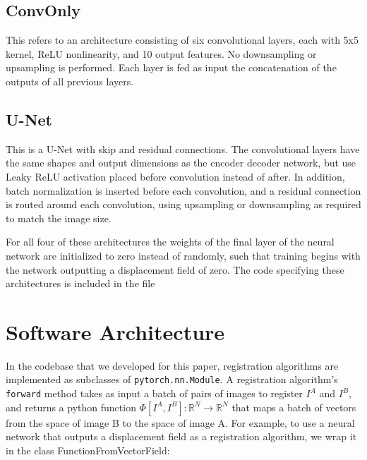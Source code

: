 \subsection{ConvOnly} This refers to an architecture consisting of six convolutional layers, each with 5x5 kernel, ReLU nonlinearity,  and 10 output features. No downsampling or upsampling is performed. Each layer is fed as input the concatenation of the outputs of all previous layers. \\ 
\subsection{U-Net} This is a U-Net with skip and residual connections. The convolutional layers have the same shapes and output dimensions as the encoder decoder network, but use Leaky ReLU activation placed before convolution instead of after. In addition, batch normalization is inserted before each convolution, and a residual connection is routed around each convolution, using upsampling or downsampling as required to match the image size. \par

For all four of these architectures the weights of the final layer of the neural network are initialized to zero instead of randomly, such that training begins with the network outputting a displacement field of zero. The code specifying these architectures is included in the file 


\section{Software Architecture}
 In the codebase that we developed for this paper, registration algorithms are implemented as subclasses of \verb|pytorch.nn.Module|. A registration algorithm's \verb|forward| method takes as input a batch of pairs of images to register $I^A$ and $I^B$, and returns a python function $\Phi[I^A, I^B]:\mathbb{R}^N \rightarrow \mathbb{R}^N$ that maps a batch of vectors from the space of image B to the space of image A. For example, to use a neural network that outputs a displacement field as a registration algorithm, we wrap it in the class FunctionFromVectorField:

